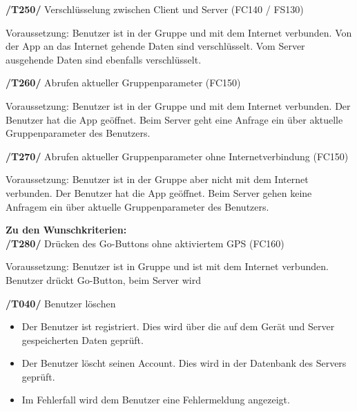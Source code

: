 \begin{itemize}
\begin{itemize}
\begin{itemize}
\begin{itemize}
\textbf{/T250/} Verschlüsselung zwischen Client und Server (FC140 / FS130)\\
\begin{itemize}
Voraussetzung: Benutzer ist in der Gruppe und mit dem Internet verbunden.
Von der App an das Internet gehende Daten sind verschlüsselt.
Vom Server ausgehende Daten sind ebenfalls verschlüsselt.
\end{itemize}

\textbf{/T260/} Abrufen aktueller Gruppenparameter (FC150)\\
\begin{itemize}
Voraussetzung: Benutzer ist in der Gruppe und mit dem Internet verbunden.
Der Benutzer hat die App geöffnet.
Beim Server geht eine Anfrage ein über aktuelle Gruppenparameter des Benutzers.
\end{itemize}

\textbf{/T270/} Abrufen aktueller Gruppenparameter ohne Internetverbindung (FC150)\\
\begin{itemize}
Voraussetzung: Benutzer ist in der Gruppe aber nicht mit dem Internet verbunden.
Der Benutzer hat die App geöffnet.
Beim Server gehen keine Anfragem ein über aktuelle Gruppenparameter des Benutzers.
\end{itemize}

\textbf{Zu den Wunschkriterien:}\\

\textbf{/T280/} Drücken des Go-Buttons ohne aktiviertem GPS (FC160)\\
\begin{itemize}
Voraussetzung: Benutzer ist in Gruppe und ist mit dem Internet verbunden.
Benutzer drückt Go-Button, beim Server wird %
\end{itemize}





\textbf{/T040/} Benutzer löschen \\
\begin{itemize}
\setlength{\itemsep}{0pt}
\item Der Benutzer ist registriert. Dies wird über die auf dem Gerät
und Server gespeicherten Daten geprüft.
\item Der Benutzer löscht seinen Account. Dies wird in der Datenbank des Servers geprüft.
\item Im Fehlerfall wird dem Benutzer eine Fehlermeldung angezeigt.
\end{itemize}


\end{itemize}
\end{itemize}
\end{itemize}
\end{itemize}

